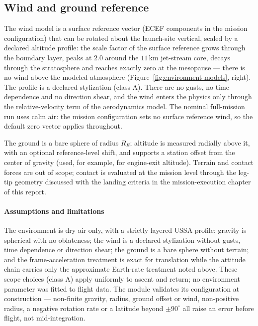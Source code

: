 \subsection{Wind and ground reference}

The wind model is a surface reference vector (ECEF components in the
mission configuration) that can be rotated about the launch-site vertical,
scaled by a declared altitude profile: the scale factor of the surface
reference grows through the boundary layer, peaks at $2.0$ around the
$11\,\mathrm{km}$ jet-stream core, decays through the stratosphere and
reaches exactly zero at the mesopause --- there is no wind above the
modeled atmosphere (Figure~\ref{fig:environment-models}, right). The
profile is a declared stylization (class A). There are no gusts, no time
dependence and no direction shear, and the wind enters the physics only
through the relative-velocity term of the aerodynamics model. The nominal
full-mission run uses calm air: the mission configuration sets no surface
reference wind, so the default zero vector applies throughout.

The ground is a bare sphere of radius $R_E$; altitude is measured radially
above it, with an optional reference-level shift, and supports a station
offset from the center of gravity (used, for example, for engine-exit
altitude). Terrain and contact forces are out of scope; contact is
evaluated at the mission level through the leg-tip geometry discussed with
the landing criteria in the mission-execution chapter of this report.

\paragraph*{Assumptions and limitations}
The environment is dry air only, with a strictly layered USSA profile;
gravity is spherical with no oblateness; the wind is a declared
stylization without gusts, time dependence or direction shear; the ground
is a bare sphere without terrain; and the frame-acceleration treatment is
exact for translation while the attitude chain carries only the
approximate Earth-rate treatment noted above. These scope choices
(class A) apply uniformly to ascent and return; no environment parameter
was fitted to flight data. The module validates its configuration at
construction --- non-finite gravity, radius, ground offset or wind,
non-positive radius, a negative rotation rate or a latitude beyond
$\pm 90^{\circ}$ all raise an error before flight, not mid-integration.
